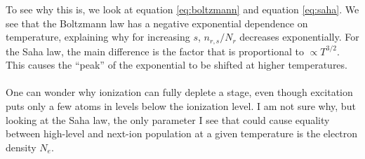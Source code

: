 \documentclass{article}
\begin{document}
To see why this is, we look at equation \eqref{eq:boltzmann} and equation \eqref{eq:saha}. We see that the Boltzmann law has a negative exponential dependence on temperature, explaining why for increasing $s$, $n_{r,s}/N_r$ decreases exponentially. For the Saha law, the main difference is the factor that is proportional to $\propto T^{3/2}$. This causes the ``peak'' of the exponential to be shifted at higher temperatures.\\\\
One can wonder why ionization can fully deplete a stage, even though excitation puts only a few atoms in levels below the ionization level. I am not sure why, but looking at the Saha law, the only parameter I see that could cause equality between high-level and next-ion population at a given temperature is the electron density $N_e$.
\end{document}
